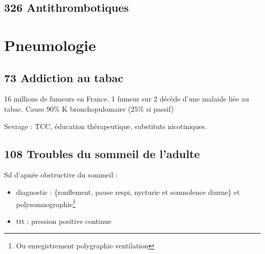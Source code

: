 \documentclass[11pt]{article}
\begin{document}
\subsection{326 Antithrombotiques}
\label{sec:org0c48a68}
\begin{table}
\caption{Antithrombotiques}
\centering
{}
\end{table}

\section{Pneumologie}
\label{sec:org4921102}
\subsection{73 Addiction au tabac}
\label{sec:org8ab1250}
16 millions de fumeurs en France. 1 fumeur sur 2 décède d'une malaide liée au
tabac.
Cause 90\% K bronchopulomaire (25\% si passif)

Sevrage : TCC, éducation thérapeutique, substituts nicotiniques.
\subsection{108 Troubles du sommeil de l'adulte}
\label{sec:orga4f1e49}
Sd d'apnée obstructive du sommeil : 
\begin{itemize}
\item diagnostic : \{ronflement, pause respi, nycturie et somnolence diurne\} et
polysomnographie\footnote{Ou enregistrement polygraphie ventilation}
\item ttt : pression positive continue
\end{itemize}
\end{document}
